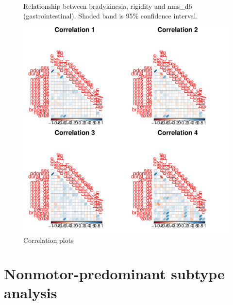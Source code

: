 \documentclass[10pt]{article}
\begin{document}
\begin{multicols}{2}
\begin{figure}[H]
  \caption{Relationship between \protect{} bradykinesia,
  \protect{} rigidity and nms\_d6 (gastrointestinal). Shaded band
is 95\% confidence interval.}
  \label{fig:corrxy-d6}
\end{figure}
\begin{figure}[H]
  \centering
  \includegraphics[width=\linewidth]{corrplots.pdf}
  \caption{Correlation plots}
  \label{fig:corrplots}
\end{figure}

\section{Nonmotor-predominant subtype analysis}

\end{multicols}
\end{document}
